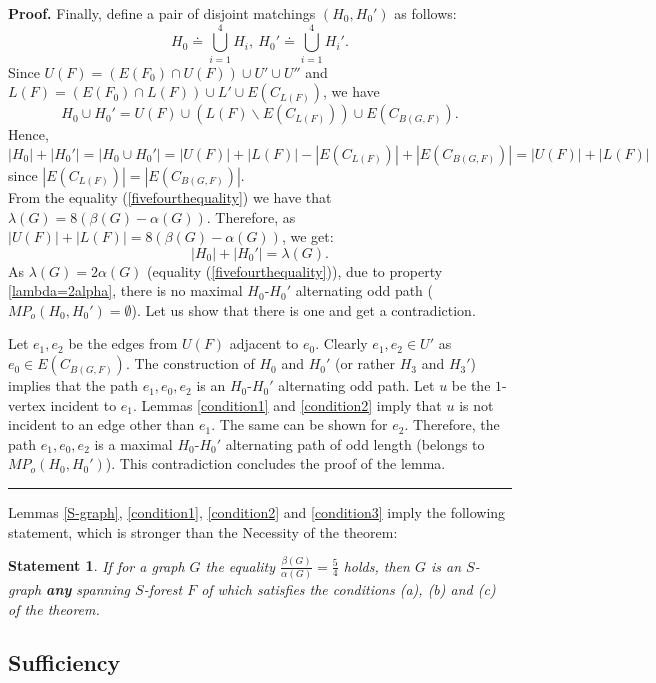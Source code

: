 \documentclass[a4paper, 12pt]{article}
\newtheorem{statement}{Statement}
\newenvironment{proof}[1][Proof]{\noindent\textbf{#1.} }{\ \rule{0.5em}{0.5em}}
\begin{document}
\begin{proof}
Finally, define a pair of disjoint matchings $(H_0,H_0')$ as
follows:
$$H_0 \doteq \bigcup_{i=1}^4 H_i, \ H_0' \doteq \bigcup_{i=1}^4 H_i'.$$
Since $U(F) = (E(F_0) \cap U(F)) \cup U' \cup U''$ and $L(F) =
(E(F_0) \cap L(F)) \cup L' \cup E(C_{L(F)})$, we have $$H_0 \cup
H_0' = U(F) \cup (L(F) \backslash E(C_{L(F)})) \cup E(C_{B(G,
F)}).$$ Hence,
$$|H_0| + |H_0'| = |H_0 \cup H_0'| = |U(F)| + |L(F)| - |E(C_{L(F)})| +
|E(C_{B(G,F)})| = |U(F)| + |L(F)|$$
since $|E(C_{L(F)})| = |E(C_{B(G,F)})|$. \\
From the equality (\ref{fivefourthequality}) we have that
$\lambda(G) = 8(\beta(G) - \alpha(G))$. Therefore, as $|U(F)| +
|L(F)| = 8(\beta(G) - \alpha(G))$, we get:
$$|H_0| + |H_0'| = \lambda(G).$$
As $\lambda(G) = 2 \alpha(G)$ (equality (\ref{fivefourthequality})),
due to property \ref{lambda=2alpha}, there is no maximal
$H_0$-$H_0'$ alternating odd path ($MP_o(H_0, H_0') = \emptyset$).
Let us show that there is one and get a contradiction.

Let $e_1, e_2$ be the edges from $U(F)$ adjacent to $e_0$. Clearly
$e_1, e_2 \in U'$ as $e_0 \in E(C_{B(G, F)})$. The construction of
$H_0$ and $H_0'$ (or rather $H_3$ and $H_3'$) implies that the path
$e_1, e_0, e_2$ is an $H_0$-$H_0'$ alternating odd path. Let $u$ be
the $1$-vertex incident to $e_1$. Lemmas \ref{condition1} and
\ref{condition2} imply that $u$ is not incident to an edge other
than $e_1$. The same can be shown for $e_2$. Therefore, the path
$e_1, e_0, e_2$ is a maximal $H_0$-$H_0'$ alternating path of odd
length (belongs to $MP_o(H_0, H_0')$). This contradiction concludes
the proof of the lemma.
\end{proof}

\bigskip
\bigskip

Lemmas \ref{S-graph}, \ref{condition1}, \ref{condition2} and
\ref{condition3} imply the following statement, which is stronger
than the Necessity of the theorem:

\begin{statement}\label{necessity}
If for a graph $G$ the equality
$\frac{\beta(G)}{\alpha(G)}=\frac{5}{4}$ holds, then $G$ is an
$S$-graph \textbf{any} spanning $S$-forest $F$ of which satisfies
the conditions (a), (b) and (c) of the theorem.
\end{statement}

\subsection{Sufficiency}
\end{document}
